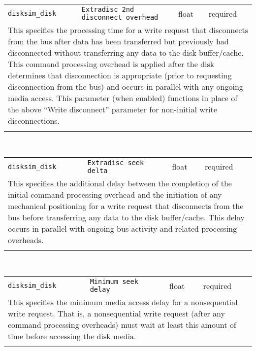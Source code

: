 \begin{tabular}{|p{\lpmodwidth}|p{\lpnamewidth}|p{0.5in}|p{0.5in}|}
\cline{1-4}
\texttt{disksim\_disk} & \texttt{Extradisc 2nd disconnect overhead} & float & required \\ 
\cline{1-4}
\multicolumn{4}{|p{6in}|}{
This specifies the processing time for a write request that disconnects
from the bus after data has been transferred but previously had
disconnected without transferring any data to the disk buffer/cache.
This command processing overhead is applied after the disk determines
that disconnection is appropriate (prior to requesting disconnection
from the bus) and occurs in parallel with any ongoing media access.
This parameter (when enabled) functions in place of the above ``Write
disconnect'' parameter for non-initial write disconnections.
}\\ 
\cline{1-4}
\multicolumn{4}{p{5in}}{}\\
\end{tabular}\\ 
\noindent 
\begin{tabular}{|p{\lpmodwidth}|p{\lpnamewidth}|p{0.5in}|p{0.5in}|}
\cline{1-4}
\texttt{disksim\_disk} & \texttt{Extradisc seek delta} & float & required \\ 
\cline{1-4}
\multicolumn{4}{|p{6in}|}{
This specifies the additional delay between the completion of the initial
command processing overhead and the initiation of any mechanical
positioning for a write request that disconnects from the bus before
transferring any data to the disk buffer/cache. This delay occurs in
parallel with ongoing bus activity and related processing overheads.
}\\ 
\cline{1-4}
\multicolumn{4}{p{5in}}{}\\
\end{tabular}\\ 
\noindent 
\begin{tabular}{|p{\lpmodwidth}|p{\lpnamewidth}|p{0.5in}|p{0.5in}|}
\cline{1-4}
\texttt{disksim\_disk} & \texttt{Minimum seek delay} & float & required \\ 
\cline{1-4}
\multicolumn{4}{|p{6in}|}{
This specifies the minimum media access delay for a nonsequential write
request. That is, a nonsequential write request (after any command
processing overheads) must wait at least this amount of time before
accessing the disk media.
}\\ 
\cline{1-4}
\multicolumn{4}{p{5in}}{}\\
\end{tabular}\\ 
